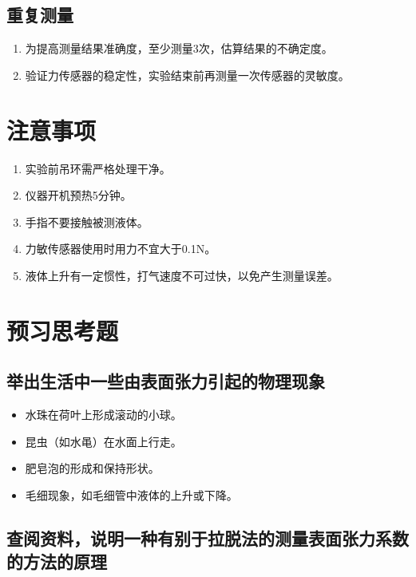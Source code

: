 \documentclass[UTF8]{ctexart}
\begin{document}
\subsection{重复测量}

\begin{enumerate}
    \item 为提高测量结果准确度，至少测量3次，估算结果的不确定度。
    \item 验证力传感器的稳定性，实验结束前再测量一次传感器的灵敏度。
\end{enumerate}

\section{注意事项}

\begin{enumerate}
    \item 实验前吊环需严格处理干净。
    \item 仪器开机预热5分钟。
    \item 手指不要接触被测液体。
    \item 力敏传感器使用时用力不宜大于0.1N。
    \item 液体上升有一定惯性，打气速度不可过快，以免产生测量误差。
\end{enumerate}

\section{预习思考题}

\subsection{举出生活中一些由表面张力引起的物理现象}

\begin{itemize}
    \item 水珠在荷叶上形成滚动的小球。
    \item 昆虫（如水黾）在水面上行走。
    \item 肥皂泡的形成和保持形状。
    \item 毛细现象，如毛细管中液体的上升或下降。
\end{itemize}

\subsection{查阅资料，说明一种有别于拉脱法的测量表面张力系数的方法的原理}
\end{document}
